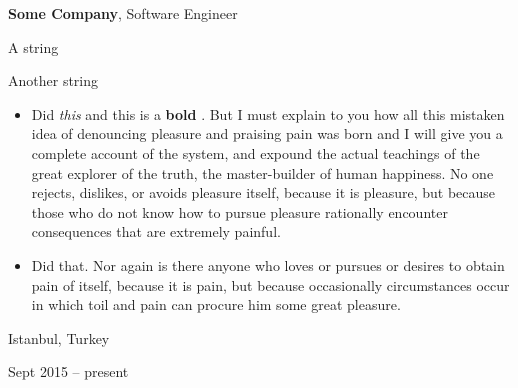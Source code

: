 \documentclass[10pt, letterpaper]{article}
\newenvironment{summary}{
    \begin{description}[
        topsep=0.10 cm,
        parsep=0.10 cm,
        partopsep=0pt,
        itemsep=0pt,
        leftmargin=0.4 cm + 10pt
    ]
}{
    \end{description}
} %
\newenvironment{highlights}{
    \begin{itemize}[
        topsep=0.10 cm,
        parsep=0.10 cm,
        partopsep=0pt,
        itemsep=0pt,
        leftmargin=0.4 cm + 10pt
    ]
}{
    \end{itemize}
} %
\newenvironment{twocolentry}[2][]{
    \onecolentry
    \def\secondColumn{#2}
    \setcolumnwidth{\fill, 4.5 cm}
    \begin{paracol}{2}
}{
    \switchcolumn \raggedleft \secondColumn
    \end{paracol}
    \endonecolentry
} %
\let\hrefWithoutArrow\href
\renewcommand{\href}[2]{\hrefWithoutArrow{#1}{\ifthenelse{\equal{#2}{}}{ }{#2 }\raisebox{.15ex}{\footnotesize \faExternalLink*}}}
\begin{document}
        \begin{twocolentry}{
            Istanbul, Turkey

        Sept 2015 – present
        }
            \textbf{Some \textnormal{Company}}, Software Engineer
            \begin{summary}
                \item A string
                \item Another string
            \end{summary}
            \begin{highlights}
                \item Did \textit{this} and this is a \textbf{bold} \href{https://example.com}{link}. But I must explain to you how all this mistaken idea of denouncing pleasure and praising pain was born and I will give you a complete account of the system, and expound the actual teachings of the great explorer of the truth, the master-builder of human happiness. No one rejects, dislikes, or avoids pleasure itself, because it is pleasure, but because those who do not know how to pursue pleasure rationally encounter consequences that are extremely painful.
                \item Did that. Nor again is there anyone who loves or pursues or desires to obtain pain of itself, because it is pain, but because occasionally circumstances occur in which toil and pain can procure him some great pleasure.
            \end{highlights}
        \end{twocolentry}


        \vspace{0.2 cm}
\end{document}
